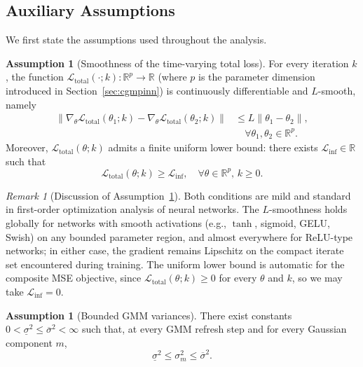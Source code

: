 \documentclass{article}
\theoremstyle{plain}
\theoremstyle{definition}
\newtheorem{assumption}[theorem]{Assumption}
\theoremstyle{remark}
\newtheorem{remark}[theorem]{Remark}
\begin{document}
\subsection{Auxiliary Assumptions}
\label{app:assumptions}

We first state the assumptions used throughout the analysis.

\begin{assumption}[Smoothness of the time-varying total loss]
	\label{ass:smooth_total}
	For every iteration $k$, the function
	$\mathcal{L}_{\mathrm{total}}(\cdot;k):\mathbb{R}^p\to\mathbb{R}$
	(where $p$ is the parameter dimension introduced in
	Section~\ref{sec:cgmpinn})
	is continuously differentiable and $L$-smooth, namely
	\begin{equation}
		\begin{split}
			\bigl\|
			\nabla_{\theta}\mathcal{L}_{\mathrm{total}}(\theta_1;k)
			-
			\nabla_{\theta}\mathcal{L}_{\mathrm{total}}(\theta_2;k)
			\bigr\|
			&\leqslant
			L\|\theta_1-\theta_2\|, \\
			&\quad \forall \theta_1,\theta_2\in\mathbb{R}^p.
		\end{split}
		\label{eq:app_smoothness}
	\end{equation}
	Moreover, $\mathcal{L}_{\mathrm{total}}(\theta;k)$ admits a finite
	uniform lower bound: there exists $\mathcal{L}_{\inf}\in\mathbb{R}$
	such that
	\begin{equation}
		\mathcal{L}_{\mathrm{total}}(\theta;k)\geqslant \mathcal{L}_{\inf},
		\quad
		\forall \theta\in\mathbb{R}^p,\, k\geqslant 0.
		\label{eq:app_lower_bound}
	\end{equation}
\end{assumption}

\begin{remark}[Discussion of Assumption~\ref{ass:smooth_total}]
	\label{rem:disc_smooth}
	Both conditions are mild and standard in first-order optimization
	analysis of neural networks.
	The $L$-smoothness holds globally for networks with smooth activations
	(e.g., $\tanh$, sigmoid, GELU, Swish) on any bounded parameter region,
	and almost everywhere for ReLU-type networks; in either case, the
	gradient remains Lipschitz on the compact iterate set encountered
	during training.
	The uniform lower bound is automatic for the composite MSE objective,
	since $\mathcal{L}_{\mathrm{total}}(\theta;k)\geqslant 0$
	for every $\theta$ and $k$, so we may take
	$\mathcal{L}_{\inf}=0$.
\end{remark}

\begin{assumption}[Bounded GMM variances]
	\label{ass:bounded_variances}
	There exist constants
	$0<\underline{\sigma}^{2}\leqslant \overline{\sigma}^{2}<\infty$
	such that, at every GMM refresh step and for every Gaussian component
	$m$,
	\begin{equation}
		\underline{\sigma}^{2}
		\leqslant
		\sigma_m^{2}
		\leqslant
		\overline{\sigma}^{2}.
		\label{eq:app_variance_bound}
	\end{equation}
\end{assumption}
\end{document}
